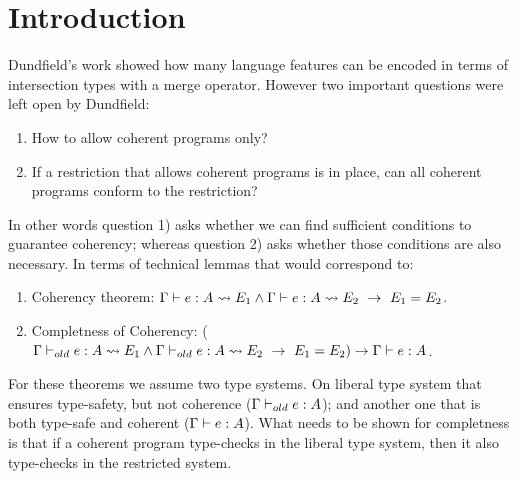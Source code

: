 \documentclass[nocopyrightspace,preprint,times,9pt]{sigplanconf}
\begin{document}



\section{Introduction}

Dundfield's work showed how many language features can be encoded in terms
of intersection types with a merge operator. However two important
questions were left open by Dundfield:

\begin{enumerate}
\item How to allow coherent programs only?

\item If a restriction that allows coherent programs is in place, can
  all coherent programs conform to the restriction?
\end{enumerate}

In other words question 1) asks whether we can find sufficient
conditions to guarantee coherency; whereas question 2) asks
whether those conditions are also necessary. In terms of technical
lemmas that would correspond to:

\begin{enumerate}

\item Coherency theorem: $\Gamma \vdash e : A \leadsto E_1 \wedge
  \Gamma \vdash e : A \leadsto E_2~\to~E_1 = E_2$.

\item Completness of Coherency: ($\Gamma \vdash_{old} e : A \leadsto E_1 \wedge
  \Gamma \vdash_{old} e : A \leadsto E_2~\to~E_1 = E_2) \to \Gamma
  \vdash e : A$.

\end{enumerate}

For these theorems we assume two type systems. On liberal type system
that ensures type-safety, but not coherence ($\Gamma \vdash_{old} e :
A$); and another one that is both type-safe and coherent  ($\Gamma \vdash e :
A$). What needs to be shown for completness is that if a coherent
program type-checks in the liberal type system, then it also
type-checks in the restricted system.


\setlength{\pdfpageheight}{\paperheight}
\setlength{\pdfpagewidth}{\paperwidth}
\end{document}
